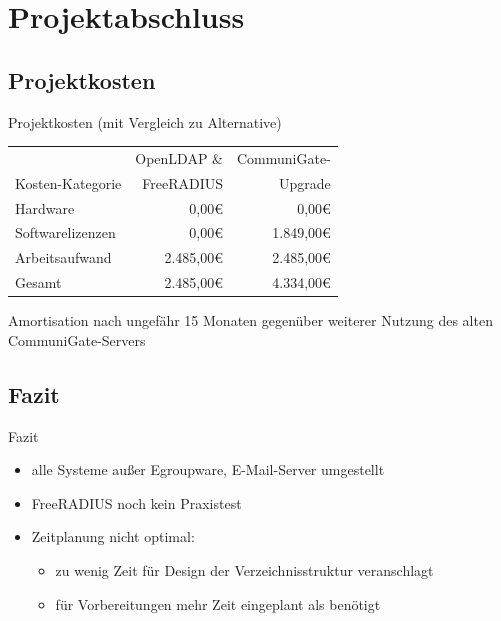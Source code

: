 \documentclass[presentation,svgnames,12pt]{beamer}
\begin{document}
\section{Projektabschluss}
\subsection{Projektkosten}
\begin{frame}{Projektkosten (mit Vergleich zu Alternative)}
\begin{table}
\centering
	\begin{tabularx}{0.9\textwidth}{|X|r|r|}
		\hline
		 	&	OpenLDAP \& &	CommuniGate-\\
		Kosten-Kategorie	&	FreeRADIUS &	Upgrade\\
		\hline
		Hardware &	0,00\euro{} &	0,00\euro{}\\
		\hline
		Softwarelizenzen &	0,00\euro{} &	1.849,00\euro{}\\
		\hline
		Arbeitsaufwand &	2.485,00\euro{} &	2.485,00\euro{}\\
		\hhline{|=|=|=|}
		Gesamt &	2.485,00\euro{} &	4.334,00\euro{}\\
		\hline
	\end{tabularx}
\end{table}
\bigskip
Amortisation nach ungefähr 15 Monaten gegenüber weiterer Nutzung des alten CommuniGate-Servers
\end{frame}

\subsection{Fazit}
\begin{frame}{Fazit}
\begin{itemize}
	\item alle Systeme außer Egroupware, E-Mail-Server umgestellt
	\item FreeRADIUS noch kein Praxistest
	\item Zeitplanung nicht optimal:
	\vspace{6pt}
	\begin{itemize}
		\item zu wenig Zeit für Design der Verzeichnisstruktur veranschlagt
		\item für Vorbereitungen mehr Zeit eingeplant als benötigt
	\end{itemize}
\end{itemize}
\end{frame}
\end{document}
